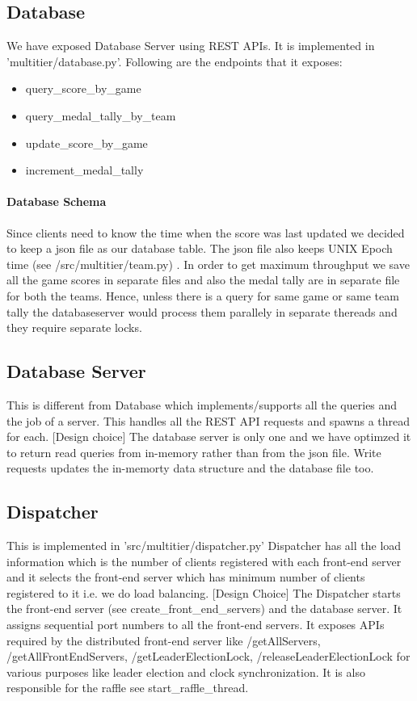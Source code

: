 \documentclass{article}
\begin{document}
\subsection{Database}
We have exposed Database Server using REST APIs. 
It is implemented in 'multitier/database.py'.
Following are the endpoints that it exposes:
\begin{itemize}
\item query\_score\_by\_game
\item query\_medal\_tally\_by\_team
\item update\_score\_by\_game
\item increment\_medal\_tally
\end{itemize}

\paragraph{Database Schema}
Since clients need to know the time when the score was last updated we 
decided to keep a json file as our database table. The json file also keeps
UNIX Epoch time (see /src/multitier/team.py) . In order to get  maximum throughput we save all the game scores in separate files and also the medal tally are in separate file for both the teams. Hence, unless there is a query for same game or same team tally the databaseserver would process them parallely in separate thereads and they require separate locks.


\subsection{Database Server}
This is different from Database which implements/supports all the queries and the job of a server. This handles all the REST API requests and spawns a thread for each. [Design choice] The database server is only one and we have optimzed it to return read queries from in-memory rather than from the json file. Write requests updates the in-memorty data structure and the database file too.

\subsection{Dispatcher}
This is implemented in 'src/multitier/dispatcher.py' Dispatcher has all the load information which is the number of clients registered with each front-end server and it selects the front-end server which has minimum number of clients registered to it i.e. we do load balancing. [Design Choice] The Dispatcher starts the front-end server (see create\_front\_end\_servers) and the database server. It assigns sequential port numbers to all the front-end servers. It exposes APIs required by the distributed front-end server like /getAllServers, /getAllFrontEndServers, /getLeaderElectionLock, /releaseLeaderElectionLock for various purposes like leader election and clock synchronization. 
It is also responsible for the raffle see start\_raffle\_thread.
\end{document}
